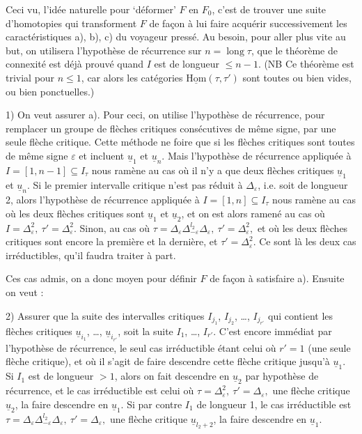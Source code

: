 \documentclass[11pt]{article}
\newcommand{\printedpage}[1]{\marginpar{\footnotesize p.~#1}}
\newcommand{\msp}[1]{\marginpar{\footnotesize [#1]}}
\newcommand{\uHom}{\underline{\mathrm{Hom}}}
\newcommand{\ul}[1]{\underline{#1}}
\begin{document}
\msp{page 89}
Ceci vu, l'idée naturelle pour ‘déformer’ $F$ en $F_0$, c'est de trouver une suite d'homotopies qui transforment $F$ de façon à lui faire acquérir successivement les caractéristiques a), b), c) du voyageur pressé. Au besoin, pour aller plus vite au but, on utilisera l'hypothèse de récurrence sur $n=\operatorname{long}\tau$, que le théorème de connexité est déjà prouvé quand $I$ est de longueur $\leq n-1$. (NB Ce théorème est trivial pour $n\leq1$, car alors les catégories $\uHom(\tau,\tau')$ sont toutes ou bien vides, ou bien ponctuelles.)

\msp{page 90}
1) On veut assurer a). Pour ceci, on utilise l'hypothèse de récurrence, pour remplacer un groupe de flèches critiques consécutives de même signe, par une seule flèche critique. Cette méthode ne foire que si les flèches critiques sont toutes de même signe $\varepsilon$ et incluent $\ul{u}_1$ et $\ul{u}_n$. Mais l'hypothèse de récurrence appliquée à $I=[1,n-1]\subseteq I_\tau$ nous ramène au cas où il n'y a que deux flèches critiques $\ul{u}_1$ et $\ul{u}_n$. Si le premier intervalle critique n'est pas réduit à $\Delta_\varepsilon$, i.e. soit de longueur 2, alors l'hypothèse de récurrence appliquée à $I=[1,n]\subseteq I_\tau$ nous ramène au cas où les deux flèches critiques sont $\ul{u}_1$ et $\ul{u}_2$, et on est
\printedpage{58}
\msp{page 91}
alors ramené au cas où $\boxed{I=\Delta^2_\varepsilon,\ \tau'=\Delta^2_\varepsilon.}$ Sinon, au cas où $\boxed{\tau=\Delta_\varepsilon\Delta^{l_2}_{-\varepsilon}\Delta_\varepsilon,\ \tau'=\Delta^2_\varepsilon,}$ et où les deux flèches critiques sont encore la première et la dernière, et $\tau'=\Delta^2_\varepsilon$. Ce sont là les deux cas irréductibles, qu'il faudra traiter à part.

Ces cas admis, on a donc moyen pour définir $F$ de façon à satisfaire a). Ensuite on veut :

2) Assurer que la suite des intervalles critiques $I_{j_1}$, $I_{j_2}$, \dots, $I_{j_{r'}}$ qui contient les flèches critiques $\ul{u}_{i_1}$, \dots, $\ul{u}_{i_{r'}}$, soit la suite $I_1$, \dots, $I_{r'}$. C'est encore immédiat par l'hypothèse de récurrence, le seul cas irréductible étant celui où $r'=1$ (une seule flèche critique), et où il s'agit de faire descendre cette flèche critique jusqu'à $\ul{u}_1$. Si $I_1$ est de longueur $>1$, alors on fait descendre en $\ul{u}_2$ par hypothèse de récurrence, et le cas irréductible est celui où $\boxed{\tau=\Delta^2_\varepsilon,\ \tau'=\Delta_\varepsilon,}$ une flèche critique $\ul{u}_2$, la faire descendre en $\ul{u}_1$. Si par contre $I_1$ de longueur 1, le cas irréductible est $\boxed{\tau=\Delta_\varepsilon\Delta^{l_2}_{-\varepsilon}\Delta_\varepsilon,\ \tau'=\Delta_\varepsilon,}$ une flèche critique $\ul{u}_{l_2+2}$, la faire descendre en $\ul{u}_1$.
\end{document}
